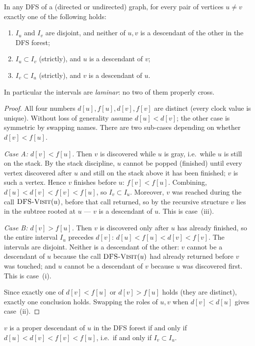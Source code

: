 \begin{theorem}\label{ch03:thm-paren}
In any DFS of a (directed or undirected) graph, for every pair of vertices $u\ne v$ exactly one of the following holds:
\begin{enumerate}
  \item[(i)] $I_u$ and $I_v$ are disjoint, and neither of $u,v$ is a descendant of the other in the DFS forest;
  \item[(ii)] $I_u\subset I_v$ (strictly), and $u$ is a descendant of $v$;
  \item[(iii)] $I_v\subset I_u$ (strictly), and $v$ is a descendant of $u$.
\end{enumerate}
In particular the intervals are \emph{laminar}: no two of them properly cross.
\end{theorem}

\begin{proof}
All four numbers $d[u],f[u],d[v],f[v]$ are distinct (every clock value is unique). Without loss of generality assume $d[u]<d[v]$; the other case is symmetric by swapping names. There are two sub-cases depending on whether $d[v]<f[u]$.

\emph{Case A: $d[v]<f[u]$.} Then $v$ is discovered while $u$ is gray, i.e.\ while $u$ is still on the stack. By the stack discipline, $u$ cannot be popped (finished) until every vertex discovered after $u$ and still on the stack above it has been finished; $v$ is such a vertex. Hence $v$ finishes before $u$: $f[v]<f[u]$. Combining, $d[u]<d[v]<f[v]<f[u]$, so $I_v\subset I_u$. Moreover, $v$ was reached during the call $\textsc{DFS-Visit}(u)$, before that call returned, so by the recursive structure $v$ lies in the subtree rooted at $u$ --- $v$ is a descendant of $u$. This is case~(iii).

\emph{Case B: $d[v]>f[u]$.} Then $v$ is discovered only after $u$ has already finished, so the entire interval $I_u$ precedes $d[v]$: $d[u]<f[u]<d[v]<f[v]$. The intervals are disjoint. Neither is a descendant of the other: $v$ cannot be a descendant of $u$ because the call $\textsc{DFS-Visit}(u)$ had already returned before $v$ was touched; and $u$ cannot be a descendant of $v$ because $u$ was discovered first. This is case~(i).

Since exactly one of $d[v]<f[u]$ or $d[v]>f[u]$ holds (they are distinct), exactly one conclusion holds. Swapping the roles of $u,v$ when $d[v]<d[u]$ gives case~(ii).
\end{proof}

\begin{corollary}\label{ch03:cor-nest}
$v$ is a proper descendant of $u$ in the DFS forest if and only if $d[u]<d[v]<f[v]<f[u]$, i.e.\ if and only if $I_v\subset I_u$.
\end{corollary}

